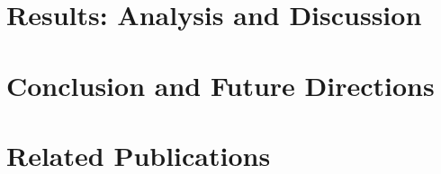 \documentclass[11pt]{book}
\begin{document}

\chapter{Results: Analysis and Discussion}
\label{ch:chap5}



\chapter{Conclusion and Future Directions}
\label{ch:conclusion}



\chapter*{Related Publications}
\label{ch:relatedPubs}




 
\end{document}
